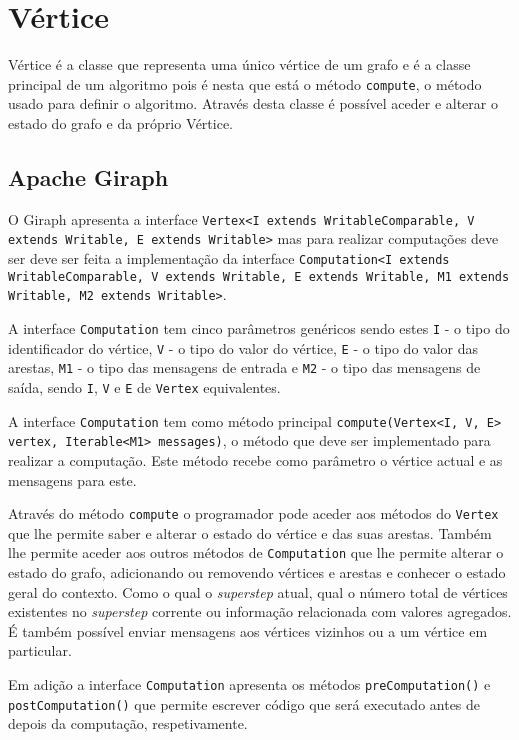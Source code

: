 \newpage
\section{Vértice}
Vértice é a classe que representa uma único vértice de um grafo e é a classe principal de um algoritmo pois é nesta que está o método \texttt{compute}, o método usado para definir o algoritmo. Através desta classe é possível aceder e alterar o estado do grafo e da próprio Vértice.
\subsection*{Apache Giraph}


O Giraph apresenta a interface \texttt{Vertex<I extends WritableComparable, V extends Writable, E extends Writable>} mas para realizar computações deve ser deve ser feita a implementação da interface \texttt{Computation<I extends WritableComparable, V extends Writable, E extends Writable, M1 extends Writable, M2 extends Writable>}.

A interface \texttt{Computation} tem cinco parâmetros genéricos sendo estes \texttt{I} - o tipo do identificador do vértice, \texttt{V} - o tipo do valor do vértice, \texttt{E} - o tipo do valor das arestas, \texttt{M1} - o tipo das mensagens de entrada e \texttt{M2} - o tipo das mensagens de saída, sendo \texttt{I}, \texttt{V} e \texttt{E} de \texttt{Vertex} equivalentes.

A interface \texttt{Computation} tem como método principal \texttt{compute(Vertex<I, V, E> vertex, Iterable<M1> messages)}, o método que deve ser implementado para realizar a computação. Este método recebe como parâmetro o vértice actual e as mensagens para este.

Através do método \texttt{compute} o programador pode aceder aos métodos do \texttt{Vertex} que lhe permite saber e alterar o estado do vértice e das suas arestas. Também lhe permite aceder aos outros métodos de \texttt{Computation} que lhe permite alterar o estado do grafo, adicionando ou removendo vértices e arestas e conhecer o estado geral do contexto. Como o qual o \textit{superstep} atual, qual o número total de vértices existentes no \textit{superstep} corrente ou informação relacionada com valores agregados. É também possível enviar mensagens aos vértices vizinhos ou a um vértice em particular.

Em adição a interface \texttt{Computation} apresenta os métodos \texttt{preComputation()} e \texttt{postComputation()} que permite escrever código que será executado antes de depois da computação, respetivamente.

